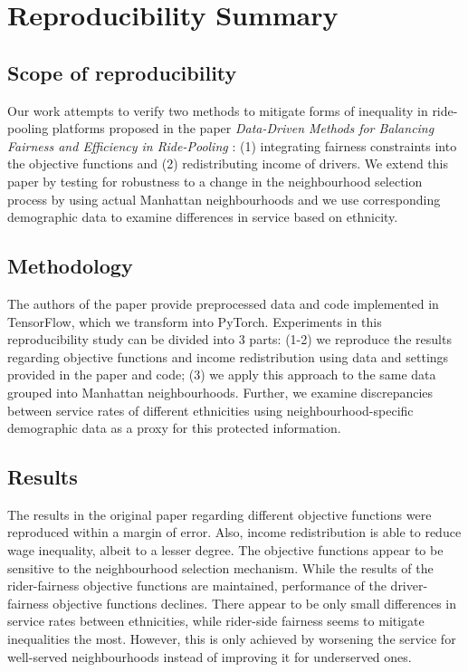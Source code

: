 \section*{Reproducibility Summary}

\subsection*{Scope of reproducibility}



Our work attempts to verify two methods to mitigate forms of inequality in ride-pooling platforms proposed in the paper \textit{Data-Driven Methods for Balancing Fairness and Efficiency in Ride-Pooling} \cite{raman21}: (1) integrating fairness constraints into the objective functions and (2) redistributing income of drivers. We extend this paper by testing for robustness to a change in the neighbourhood selection process by using actual Manhattan neighbourhoods and we use corresponding demographic data to examine differences in service based on ethnicity.

\subsection*{Methodology}



The authors of the paper provide preprocessed data and code implemented in TensorFlow, which we transform into PyTorch. Experiments in this reproducibility study can be divided into 3 parts: (1-2) we reproduce the results regarding objective functions and income redistribution using data and settings provided in the paper and code; (3) we apply this approach to the same data grouped into Manhattan neighbourhoods. Further, we examine discrepancies between service rates of different ethnicities using neighbourhood-specific demographic data as a proxy for this protected information.


\subsection*{Results}



The results in the original paper regarding different objective functions were reproduced within a margin of error. Also, income redistribution is able to reduce wage inequality, albeit to a lesser degree. The objective functions appear to be sensitive to the neighbourhood selection mechanism. While the results of the rider-fairness objective functions are maintained, performance of the driver-fairness objective functions declines. There appear to be only small differences in service rates between ethnicities, while rider-side fairness seems to mitigate inequalities the most. However, this is only achieved by worsening the service for well-served neighbourhoods instead of improving it for underserved ones.






